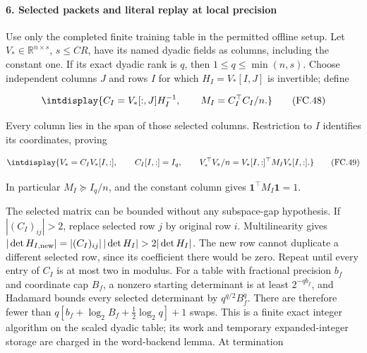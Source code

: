 \paragraph{6. Selected packets and literal replay at local precision}

\mbox{}\par\smallskip


Use only the completed finite training table in the permitted offline setup. Let \(V_\ast\in\mathbb R^{n\times s}\), \(s\le CR\), have its named dyadic fields as columns, including the constant one. If its exact dyadic rank is \(q\), then \(1\le q\le\min(n,\allowbreak s)\). Choose independent columns \(J\) and rows \(I\) for which \(H_I=V_\ast[I,\allowbreak J]\) is invertible; define


\begingroup\renewcommand{\theHequation}{intdisplay.753}
\begin{equation}
\intdisplay{
C_I=V_\ast[:,J]H_I^{-1},\qquad M_I=C_I^\top C_I/n.
}
\tag{FC.48}
\label{int:eq-0353-fc-48}
\end{equation}
\endgroup


Every column lies in the span of those selected columns. Restriction to \(I\) identifies its coordinates, proving


\begingroup\renewcommand{\theHequation}{intdisplay.754}
\begin{equation}
\intdisplay{
V_\ast=C_I V_\ast[I,:],\qquad C_I[I,:]=I_q,
\qquad
V_\ast^\top V_\ast/n=V_\ast[I,:]^\top M_I V_\ast[I,:].
}
\tag{FC.49}
\label{int:eq-0354-fc-49}
\end{equation}
\endgroup


In particular \(M_I\succeq I_q/n\), and the constant column gives \(\boldsymbol1^\top M_I\boldsymbol1=1\).



The selected matrix can be bounded without any subspace-gap hypothesis. If \(|(C_I)_{ij}|>2\), replace selected row \(j\) by original row \(i\). Multilinearity gives \(|\det H_{I,\allowbreak \rm new}|=|(C_I)_{ij}|\,\allowbreak |\det H_I|>2|\det H_I|\). The new row cannot duplicate a different selected row, since its coefficient there would be zero. Repeat until every entry of \(C_I\) is at most two in modulus. For a table with fractional precision \(b_f\) and coordinate cap \(B_f\), a nonzero starting determinant is at least \(2^{-qb_f}\), and Hadamard bounds every selected determinant by \(q^{q/2}B_f^q\). There are therefore fewer than \(q[b_f+\log_2 B_f+\tfrac12\log_2q]+1\) swaps. This is a finite exact integer algorithm on the scaled dyadic table; its work and temporary expanded-integer storage are charged in the word-backend lemma. At termination


